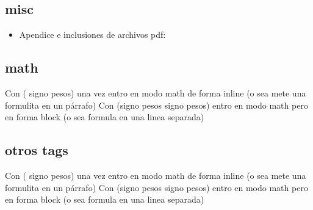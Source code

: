 \begin{Document}
  \subsection{misc}
  \begin{itemize}
  \Item
  Indice: es en realidad \\tableofcontents y se genera a partir de las secciones, capitulos,etc. No va andar si corriste una sola vez por que donde se genera tdv no se conocen las secciones.
  \Item 
  Referencias: \\label{marker} / \\ref{marker} . Idem indice(tableofcontents) se generan con la segunda corrida
  \item
  Apendice e inclusiones de archivos pdf:
  \end{itemize}

  \subsection{math}
  \begin{itemize}
  \Item
  Con  ( signo pesos) una vez entro en modo math de forma inline (o sea mete una formulita en un p\'arrafo)
  \Item 
  Con (signo pesos signo pesos) entro en modo math pero en forma block (o sea formula en una linea separada)
  \end{itemize}

  \subsection{otros tags}
  \begin{itemize}
  \Item
  Con  ( signo pesos) una vez entro en modo math de forma inline (o sea mete una formulita en un p\'arrafo)
  \Item 
  Con (signo pesos signo pesos) entro en modo math pero en forma block (o sea formula en una linea separada)
  \end{itemize}
  

\end{Document}


